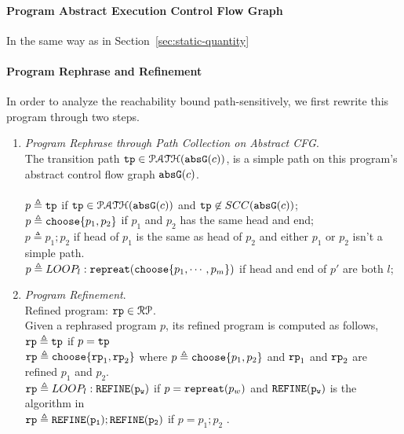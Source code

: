 \paragraph{Program Abstract Execution Control Flow Graph}
In the same way as in Section~\ref{sec:static-quantity}

\paragraph{Program Rephrase and Refinement}
In order to analyze the reachability bound path-sensitively, we first rewrite this program through two steps.
\begin{enumerate}
  \item \emph{Program Rephrase through Path Collection on Abstract CFG}.
  \\
  The transition path
  $\mathtt{tp} \in \mathcal{PATH}(\mathtt{abs}{\mathtt{G}}(c))$, is a simple path on this program's abstract control flow graph $\mathtt{abs}{\mathtt{G}}(c)$.
  \\
  \\
  $p \triangleq \mathtt{tp} $ if $\mathtt{tp} \in \mathcal{PATH}(\mathtt{abs}{\mathtt{G}}(c))$ and $\mathtt{tp} \not\in SCC(\mathtt{abs}{\mathtt{G}}(c))$;
  \\
  $p \triangleq \mathtt{choose}\{p_1, p_2 \}$ if $p_1$ and $p_2$ has the same head and end;
  \\
  $p \triangleq p_1; p_2$ if head of $p_1$ is the same as head of $p_2$ and either $p_1$ or $p_2$ isn't a simple path. 
  \\
  $p \triangleq LOOP_l : \mathtt{repreat}(\mathtt{choose}\{p_1, \cdots, p_m\})$ if head and end of $p'$ are both $l$;
\item \emph{Program Refinement}.
\\
  Refined program:
  $\mathtt{rp} \in \mathcal{RP}$.
  \\
  Given a rephrased program $p$, its refined program is computed as follows,
  \\
  $\mathtt{rp} \triangleq \mathtt{tp} $ if $p = \mathtt{tp}$\\
  $\mathtt{rp} \triangleq \mathtt{choose}\{\mathtt{rp}_1, \mathtt{rp}_2 \}$ where $p \triangleq \mathtt{choose}\{p_1, p_2 \}$ and 
    $\mathtt{rp}_1$ and $\mathtt{rp}_2$ are refined $p_1$ and $p_2$. 
    \\
  $\mathtt{rp} \triangleq LOOP_l : \mathtt{REFINE(p_w)}$  if $p = \mathtt{repreat}(p_w)$ and  $\mathtt{REFINE(p_w)}$ is the algorithm in \\
  $\mathtt{rp} \triangleq \mathtt{REFINE(p_1)}; \mathtt{REFINE(p_2)}$  if $p = p_1; p_2$ 
  \cite{sinn2017complexity}.
\end{enumerate}
